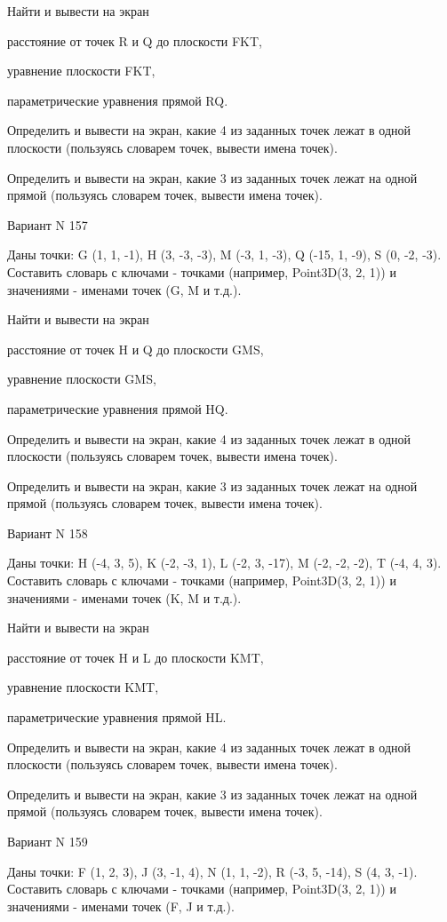 \documentclass[11pt]{report}
\begin{document}
Найти и вывести на экран


расстояние от точек R и Q до плоскости FKT,


уравнение плоскости FKT,


параметрические уравнения прямой RQ.


Определить и вывести на экран, какие 4 из заданных точек лежат в одной плоскости (пользуясь словарем точек, вывести имена точек).


Определить и вывести на экран, какие 3 из заданных точек лежат на одной прямой (пользуясь словарем точек, вывести имена точек).

\newpage
Вариант N 157

Даны точки: G (1, 1, -1), H (3, -3, -3), M (-3, 1, -3), Q (-15, 1, -9), S (0, -2, -3).
Составить словарь с ключами - точками (например, Point3D(3, 2, 1)) и значениями - именами точек (G, M и т.д.).


Найти и вывести на экран


расстояние от точек H и Q до плоскости GMS,


уравнение плоскости GMS,


параметрические уравнения прямой HQ.


Определить и вывести на экран, какие 4 из заданных точек лежат в одной плоскости (пользуясь словарем точек, вывести имена точек).


Определить и вывести на экран, какие 3 из заданных точек лежат на одной прямой (пользуясь словарем точек, вывести имена точек).

\newpage
Вариант N 158

Даны точки: H (-4, 3, 5), K (-2, -3, 1), L (-2, 3, -17), M (-2, -2, -2), T (-4, 4, 3).
Составить словарь с ключами - точками (например, Point3D(3, 2, 1)) и значениями - именами точек (K, M и т.д.).


Найти и вывести на экран


расстояние от точек H и L до плоскости KMT,


уравнение плоскости KMT,


параметрические уравнения прямой HL.


Определить и вывести на экран, какие 4 из заданных точек лежат в одной плоскости (пользуясь словарем точек, вывести имена точек).


Определить и вывести на экран, какие 3 из заданных точек лежат на одной прямой (пользуясь словарем точек, вывести имена точек).

\newpage
Вариант N 159

Даны точки: F (1, 2, 3), J (3, -1, 4), N (1, 1, -2), R (-3, 5, -14), S (4, 3, -1).
Составить словарь с ключами - точками (например, Point3D(3, 2, 1)) и значениями - именами точек (F, J и т.д.).
\end{document}
